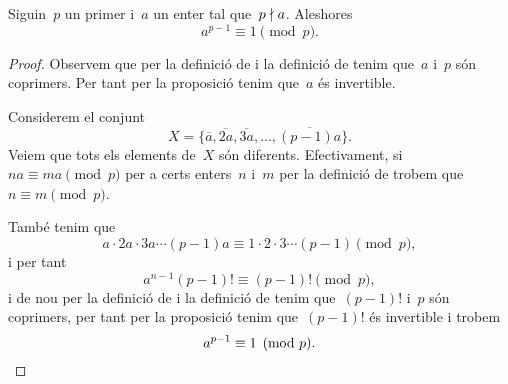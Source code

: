 \documentclass[../../main.tex]{subfiles}
\begin{document}
    \begin{theorem}
        \label{thm:el Petit Teorema de Fermat}
        Siguin~\(p\) un primer i~\(a\) un enter tal que~\(p\mathrel{\nmid} a\).
        Aleshores
        \[
            a^{p-1}\equiv1\pmod{p}.
        \]
        \begin{proof}
            Observem que per la definició de  i la definició de  tenim que~\(a\) i~\(p\) són coprimers.
            Per tant per la proposició  tenim que~\(a\) és invertible.

            Considerem el conjunt
            \[
                X=\{\overline{a},\overline{2a},\overline{3a},\dots,\overline{(p-1)a}\}.
            \]
            Veiem que tots els elements de~\(X\) són diferents.
            Efectivament, si~\(na\equiv ma\pmod{p}\) per a certs enters~\(n\) i~\(m\) per la definició de  trobem que~\(n\equiv m\pmod{p}\).

            També tenim que %
            \[
                a\cdot2a\cdot3a\cdots(p-1)a\equiv 1\cdot2\cdot3\cdots(p-1)\pmod{p},
            \]
            i per tant
            \[
                a^{n-1}(p-1)!\equiv(p-1)!\pmod{p},
            \]
            i de nou per la definició de  i la definició de  tenim que~\((p-1)!\) i~\(p\) són coprimers, per tant per la proposició  tenim que~\((p-1)!\) és invertible i trobem
            \[
                a^{p-1}\equiv1\pmod{p}.\qedhere
            \]
        \end{proof}
    \end{theorem}
\end{document}
